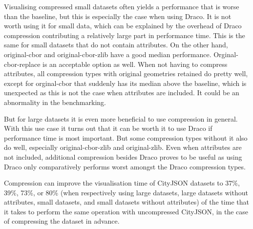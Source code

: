 Visualising compressed small datasets often yields a performance that is worse than the baseline, but this is especially the case when using Draco.
It is not worth using it for small data, which can be explained by the overhead of Draco compression contributing a relatively large part in performance time.
This is the same for small datasets that do not contain attributes.
On the other hand, original-cbor and original-cbor-zlib have a good median performance. Orginal-cbor-replace is an acceptable option as well.
When not having to compress attributes, all compression types with original geometries retained do pretty well, except for orginal-cbor that suddenly has its median above the baseline, which is unexpected as this is not the case when attributes are included.
It could be an abnormality in the benchmarking.

But for large datasets it is even more beneficial to use compression in general.
With this use case it turns out that it can be worth it to use Draco if performance time is most important.
But some compression types without it also do well, especially original-cbor-zlib and original-zlib.
Even when attributes are not included, additional compression besides Draco proves to be useful as using Draco only comparatively performs worst amongst the Draco compression types.

Compression can improve the visualisation time of CityJSON datasets to 37\%, 39\%, 73\%, or 80\% (when respectively using large datasets, large datasets without attributes, small datasets, and small datasets without attributes) of the time that it takes to perform the same operation with uncompressed CityJSON, in the case of compressing the dataset in advance.


